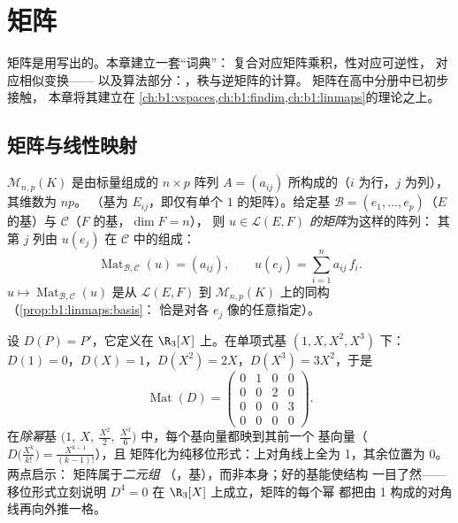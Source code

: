 \chapter{矩阵}\label{ch:b1:matrices}

矩阵是用写出的。本章建立一套“词典”：
复合对应矩阵乘积，性对应可逆性，
对应相似变换——
以及算法部分：，秩与逆矩阵的计算。
矩阵在高中分册中已初步接触，
本章将其建立在
\cref{ch:b1:vspaces,ch:b1:findim,ch:b1:linmaps}的理论之上。

\section{矩阵与线性映射}

\begin{definition}\label{def:b1:matrices:def}
$\mathcal{M}_{n,p}(K)$ 是由标量组成的 $n \times p$ 阵列 $A
= (a_{ij})$ 所构成的（$i$ 为行，$j$ 为列），其维数为 $np$。
（基为 $E_{ij}$，即仅有单个 $1$ 的矩阵）。给定基
$\mathcal{B} = (e_1, \dots, e_p)$（$E$ 的基）与 $\mathcal{C}$（$F$ 的基，$\dim F = n$），
则 \emph{$u \in \mathcal{L}(E, F)$ 的矩阵}为这样的阵列：
其第 $j$ 列由 $u(e_j)$ 在
$\mathcal{C}$ 中的组成：
\[
\operatorname{Mat}_{\mathcal{B},\mathcal{C}}(u) = (a_{ij}),
\qquad u(e_j) = \sum_{i=1}^{n} a_{ij}\, f_i .
\]
 $u \mapsto \operatorname{Mat}_{\mathcal{B},\mathcal{C}}(u)$
是从 $\mathcal{L}(E, F)$ 到
$\mathcal{M}_{n,p}(K)$ 上的同构（\cref{prop:b1:linmaps:basis}：
恰是对各 $e_j$ 像的任意指定）。
\end{definition}

\begin{example}[导数的矩阵表示]
\label{ex:b1:matrices:derivative}
设 $D(P) = P'$，它定义在 $\R_3[X]$ 上。在单项式基 $(1, X, X^2,
X^3)$ 下：$D(1) = 0$，$D(X) = 1$，$D(X^2) = 2X$，$D(X^3) = 3X^2$，于是
\[
\operatorname{Mat}(D) =
\begin{pmatrix}
0 & 1 & 0 & 0\\
0 & 0 & 2 & 0\\
0 & 0 & 0 & 3\\
0 & 0 & 0 & 0
\end{pmatrix}.
\]
在\emph{除幂}基 $\bigl(1,\ X,\ \frac{X^2}2,\
\frac{X^3}6\bigr)$ 中，每个基向量都映到其前一个
基向量（$D\bigl(\frac{X^k}{k!}\bigr) = \frac{X^{k-1}}{(k-1)!}$），且
矩阵化为纯移位形式：上对角线上全为 1，其余位置为 0。两点启示：
矩阵属于\emph{二元组}
（，基），而非本身；好的基能使结构
一目了然——移位形式立刻说明
$D^4 = 0$ 在 $\R_3[X]$ 上成立，矩阵的每个幂
都把由 1 构成的对角线再向外推一格。
\end{example}

